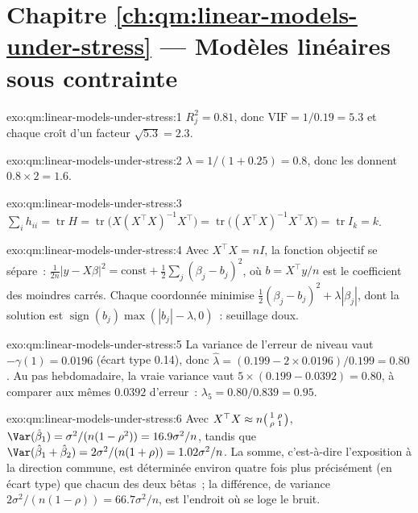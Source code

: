 \section*{Chapitre \ref{ch:qm:linear-models-under-stress} --- Modèles linéaires sous contrainte}

\begin{solution}{exo:qm:linear-models-under-stress:1}
$R_j^2 = 0.81$, donc $\mathrm{VIF} = 1/0.19 = 5.3$ et chaque  croît d'un facteur $\sqrt{5.3} = 2.3$.
\end{solution}

\begin{solution}{exo:qm:linear-models-under-stress:2}
$\lambda = 1/(1 + 0.25) = 0.8$, donc les  donnent $0.8 \times 2 = 1.6$.
\end{solution}

\begin{solution}{exo:qm:linear-models-under-stress:3}
$\sum_ih_{ii} = \operatorname{tr}H = \operatorname{tr}\bigl(X(X^\top X)^{-1}X^\top\bigr) = \operatorname{tr}\bigl((X^\top X)^{-1}X^\top X\bigr) = \operatorname{tr}I_k = k$.
\end{solution}

\begin{solution}{exo:qm:linear-models-under-stress:4}
Avec $X^\top X = nI$, la fonction objectif se sépare~: $\frac1{2n}\lvert y - X\beta\rvert^2 = \mathrm{const} + \frac12\sum_j(\beta_j - b_j)^2$, où $b = X^\top y/n$ est le
coefficient des moindres carrés. Chaque coordonnée minimise $\frac12(\beta_j - b_j)^2 + \lambda|\beta_j|$, dont la solution est $\operatorname{sign}(b_j)\max(|b_j| -
\lambda, 0)$~: seuillage doux.
\end{solution}

\begin{solution}{exo:qm:linear-models-under-stress:5}
La variance de l'erreur de niveau vaut $-\gamma(1) = 0.0196$ (écart type 0.14), donc $\hat\lambda = (0.199 - 2 \times 0.0196)/0.199 = 0.80$. Au pas hebdomadaire, la vraie
variance vaut $5 \times (0.199 - 0.0392) = 0.80$, à comparer aux mêmes $0.0392$ d'erreur~: $\lambda_5 = 0.80/0.839 = 0.95$.
\end{solution}

\begin{solution}{exo:qm:linear-models-under-stress:6}
Avec $X^\top X \approx n\begin{psmallmatrix}1 & \rho\\ \rho & 1\end{psmallmatrix}$, $\Var(\hat\beta_1) = \sigma^2/(n(1 - \rho^2)) = 16.9\sigma^2/n$, tandis que
$\Var(\hat\beta_1 + \hat\beta_2) = 2\sigma^2/(n(1 + \rho)) = 1.02\sigma^2/n$. La somme, c'est-à-dire l'exposition à la direction commune, est déterminée environ quatre fois
plus précisément (en écart type) que chacun des deux bêtas~; la différence, de variance $2\sigma^2/(n(1 - \rho)) = 66.7\sigma^2/n$, est l'endroit où
se loge le bruit.
\end{solution}

